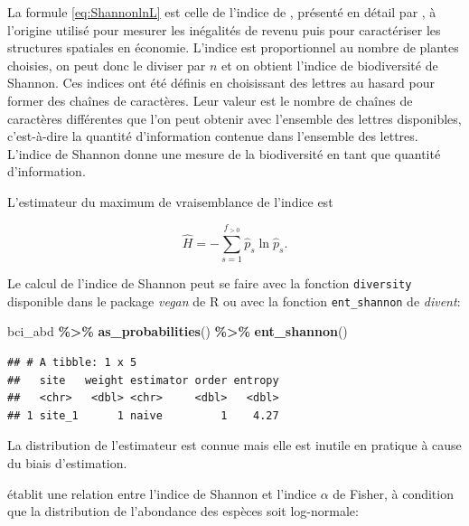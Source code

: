 \documentclass[
  11pt,
  american,
  a4paper,
  extrafontsizes,onecolumn,openright
  ]{memoir}
\newenvironment{Shaded}{\begin{snugshade}}{\end{snugshade}}
\newcommand{\FunctionTok}[1]{\textcolor[rgb]{0.13,0.29,0.53}{\textbf{#1}}}
\newcommand{\NormalTok}[1]{#1}
\newcommand{\SpecialCharTok}[1]{\textcolor[rgb]{0.81,0.36,0.00}{\textbf{#1}}}
\begin{document}
La formule \eqref{eq:ShannonlnL} est celle de l'indice de \textcite{Theil1967}, présenté en détail par \textcite{Conceicao2000}, à l'origine utilisé pour mesurer les inégalités de revenu puis pour caractériser les structures spatiales en économie.
L'indice est proportionnel au nombre de plantes choisies, on peut donc le diviser par \(n\) et on obtient l'indice de biodiversité de Shannon.
Ces indices ont été définis en choisissant des lettres au hasard pour former des chaînes de caractères.
Leur valeur est le nombre de chaînes de caractères différentes que l'on peut obtenir avec l'ensemble des lettres disponibles, c'est-à-dire la quantité d'information contenue dans l'ensemble des lettres.
L'indice de Shannon donne une mesure de la biodiversité en tant que quantité d'information.

L'estimateur du maximum de vraisemblance de l'indice est

\begin{equation}
  \label{eq:EstShannonML}
  \hat{H} = -\sum^{f_{>0}}_{s=1}{\hat{p}_s \ln{\hat{p}_s}}.
\end{equation}

Le calcul de l'indice de Shannon peut se faire avec la fonction \texttt{diversity} disponible dans le package \emph{vegan} de R ou avec la fonction \texttt{ent\_shannon} de \emph{divent}:

\scriptsize

\begin{Shaded}
\begin{Highlighting}[]
\NormalTok{bci\_abd }\SpecialCharTok{\%\textgreater{}\%} 
  \FunctionTok{as\_probabilities}\NormalTok{() }\SpecialCharTok{\%\textgreater{}\%} 
  \FunctionTok{ent\_shannon}\NormalTok{()}
\end{Highlighting}
\end{Shaded}

\begin{verbatim}
## # A tibble: 1 x 5
##   site   weight estimator order entropy
##   <chr>   <dbl> <chr>     <dbl>   <dbl>
## 1 site_1      1 naive         1    4.27
\end{verbatim}

\normalsize

La distribution de l'estimateur est connue \autocite{Hutcheson1970} mais elle est inutile en pratique à cause du biais d'estimation.

\textcite{Bulmer1974} établit une relation entre l'indice de Shannon et l'indice \(\alpha\) de Fisher, à condition que la distribution de l'abondance des espèces soit log-normale:
\end{document}
